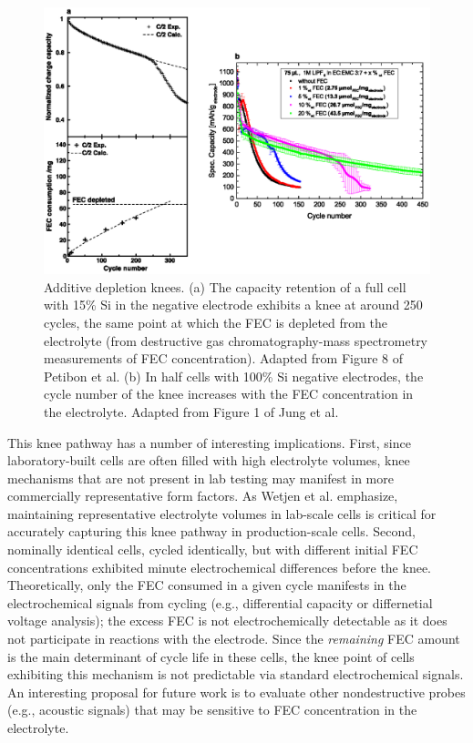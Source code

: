 \documentclass[journal=jpcl, manuscript=article, layout=onecolumn]{achemso}
\begin{document}
\begin{figure}[ht]
\centering
\includegraphics[scale = 1]{figures/fec_depletion.eps}
\caption{Additive depletion knees.
(a) The capacity retention of a full cell with 15\% Si in the negative electrode exhibits a knee at around 250 cycles, the same point at which the FEC is depleted from the electrolyte (from destructive gas chromatography-mass spectrometry measurements of FEC concentration). Adapted from Figure 8 of Petibon et al.\cite{petibon_studies_2016}
(b) In half cells with 100\% Si negative electrodes, the cycle number of the knee increases with the FEC concentration in the electrolyte. Adapted from Figure 1 of Jung et al.\cite{jung_consumption_2016}}
\label{fig:fec_knee}
\end{figure}

This knee pathway has a number of interesting implications.
First, since laboratory-built cells are often filled with high electrolyte volumes, knee mechanisms that are not present in lab testing may manifest in more commercially representative form factors.
As Wetjen et al.\cite{wetjen_differentiating_2017} emphasize,
maintaining representative electrolyte volumes in lab-scale cells is critical for accurately capturing this knee pathway in production-scale cells.
Second, nominally identical cells, cycled identically, but with different initial FEC concentrations exhibited minute electrochemical differences before the knee.\cite{jung_consumption_2016}
Theoretically, only the FEC consumed in a given cycle manifests in the electrochemical signals from cycling (e.g., differential capacity or differnetial voltage analysis); the excess FEC is not electrochemically detectable as it does not participate in reactions with the electrode.
Since the \emph{remaining} FEC amount is the main determinant of cycle life in these cells, the knee point of cells exhibiting this mechanism is not predictable via standard electrochemical signals.
An interesting proposal for future work is to evaluate other nondestructive probes (e.g., acoustic signals\cite{knehr_understanding_2018}) that may be sensitive to FEC concentration in the electrolyte.
\end{document}
